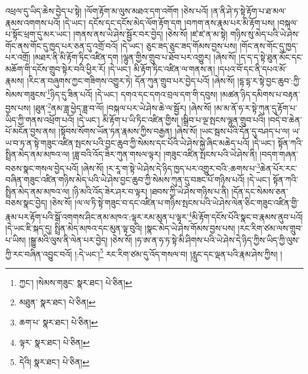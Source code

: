 འཕྲལ་དུ་ཡིད་ཆེས་བྱེད་པ་སྟེ། །ལོག་རྟོག་མ་ལུས་མཐའ་དག་འགོག །ཅེས་པའོ། །ན་ནི་ཤེ་ཏ་སྟེ་རྟོག་པ་ཐ་མལ་རྣམས་འགགས་པའོ། །དེ་ཡང་། དངོས་དང་དངོས་མེད་ལོག་རྟོག་དག །བཀག་ནས་རྣམ་པར་མི་རྟོག་པས། །བསྐལ་པ་སྟོང་ཕྲག་དུ་མར་ཡང་། །གནས་ནས་ཡེ་ཤེས་སྦྱོར་བར་བྱེད། །ཅེས་སོ། །ཛ་ཛ་ན་མ་སྟེ། གཉིས་སུ་མེད་པའི་ཡེ་ཤེས་གོང་ནས་གོང་དུ་ཁྱད་པར་ཅན་དུ་འགྲོ་བའོ། །དེ་ཡང་། ཅུང་ཟད་ཅུང་ཟད་གོམས་བྱས་པས། །གོང་ནས་གོང་དུ་ཁྱད་པར་འགྲོ། །མཐར་ནི་མི་རྟོག་ཏིང་འཛིན་དག །ལྷུན་གྱིས་གྲུབ་པ་ཐོབ་པར་འགྱུར། །ཞེས་སོ། །ད་ད་ད་སྟེ་ཐུན་མོང་དང་མཆོག་གི་དངོས་གྲུབ་སྟེར་བའི་ཕྱིར་རོ། །དེ་ཡང་། མི་རྟོག་ཏིང་འཛིན་ལ་གནས་ན། །དཔའ་བོ་དང་ནི་དཔའ་མོ་རྣམས། །རིང་ན་བཞུགས་ཀྱང་གཟིགས་འགྱུར་ཏེ། དོན་ཀུན་གྲུབ་པར་བྱེད་པའོ། །ཞེས་སོ། །དྷ་དྷ་ར་སྟེ་བྱང་ཆུབ་:ཀྱི་སེམས་གཟུངས་\footnote{ཀྱང་། །སེམས་གཟུང་  སྣར་ཐང་།  པེ་ཅིན། }ཉིད་དུ་ཟིན་པའོ། །དེ་ཡང་། དགའ་དང་དགའ་བྲལ་དག་གི་དབུས། །མཚན་ཉིད་དམིགས་པ་བརྟན་བྱས་པས། །ཐུན་\footnote{མཐུན་  སྣར་ཐང་།  པེ་ཅིན། }ནམ་ཟླ་ཕྱེད་ཟླ་བ་ལོ། །བསྐལ་པར་ཡེ་ཤེས་ཆེ་ལ་སྦྱོར། །ཞེས་སོ། །མ་མ་ནོ་ཧ་ར་སྟེ་ཀུན་དུ་རྟོག་པ་ཡིད་ཀྱི་གནས་འཕྲོག་པའོ། །དེ་ཡང་། མི་རྟོག་པ་ཡི་ཏིང་འཛིན་གྱིས། །སྒྲིབ་པ་ལྔ་སྤངས་ལྷུན་གྲུབ་པའི། །བདེ་བ་ཆེན་པོ་མངོན་བྱས་ནས། །སྟོབས་སོགས་ཡོན་ཏན་རྣམས་ཀྱིས་བརྒྱན། །ཞེས་སོ། །ཡང་སྦས་པའི་དོན་དུ་བཤད་པ་ལ། ཡ་ཡ་བ་ཏ་ན་སྟེ་གཟུང་འཛིན་སྤངས་པའི་བྱང་ཆུབ་ཀྱི་སེམས་དང་པོའི་ཡེ་ཤེས་སྐྱེ་ཞིང་མཆེད་པའོ། །དེ་ཡང་། སྟོན་ཀའི་སྤྲིན་མེད་ནམ་མཁའ་ལ། །ཟླ་བའི་འོད་ཟེར་ཀུན་གསལ་ལྟར། །གཟུང་འཛིན་སྤངས་པའི་ཡེ་ཤེས་ནི། །བདག་གཞན་བཅས་སྣང་གསལ་བྱེད་པའོ། །ཞེས་སོ། །ར་རཱ་ག་སྟེ་ཡེ་ཤེས་དེ་ཉིད་ཁྱད་པར་འགྱུར་བའི་:ཆགས་པ་\footnote{ཆག་པ་  སྣར་ཐང་།  པེ་ཅིན། }ཆེན་པོར་རང་བཞིན་གཟུང་འཛིན་གཉིས་མེད་པའི་ཡེ་ཤེས་བྱང་ཆུབ་ཀྱི་སེམས་ཀུན་དུ་བཟང་པོ་གཉིས་པའོ། །དེ་ཡང་། སྟོན་ཀའི་སྤྲིན་མེད་ནམ་མཁའ་ལ། །ཉི་མའི་འོད་ཟེར་ཤར་བ་ལྟར། །ཐབས་ཀྱི་ཡེ་ཤེས་གཉིས་པ་ནི། །དོན་དང་སེམས་ཅན་བཅས་སྣང་བྱེད། །ཅེས་སོ། །ལ་ལ་ཏི་སྟེ་གཟུང་བ་དང་འཛིན་པ་གཉིས་སྤངས་པའི་ཡེ་ཤེས་ལེན་ཅིང་གཟུང་འཛིན་གྱི་རྣམ་པར་རྟོག་པའི་སྒོ་འགགས་ཤིང་ནམ་མཁའ་:ལྟར་རམ་མུན་པ་ལྟར་\footnote{ལྟར་  སྣར་ཐང་།  པེ་ཅིན། }མི་རྟོག་དངོས་པོའི་སྣང་བ་རྣམས་ནུབ་པའོ། །དེ་ཡང་ཇི་སྐད་དུ། སྤྲིན་མེད་མཁའ་དང་མུན་ལྟ་བུའི། །སྣང་མེད་ཡེ་ཤེས་གོམས་བྱས་པས། །རང་རིག་ཙམ་ལས་གྲུབ་པ་ཡིས། །སྒྱུ་མའི་ལུས་ནི་ལེན་པར་བྱེད། །ཅེས་སོ། །ཧ་ཨ་ན་ཧ་ཏ་སྟེ་མི་ཤིགས་པའི་ཡེ་ཤེས་དེ་ཉིད་ཀྱིས་ཡིད་ཀྱི་ལུས་ཀྱི་རང་བཞིན་འབྱུང་བའོ། །:དེ་ཡང་།\footnote{དེའི།  སྣར་ཐང་།  པེ་ཅིན། } རང་རིག་ཙམ་དུ་འོད་གསལ་བ། །རླུང་དང་ལྡན་པའི་རྣམ་ཤེས་ཀྱིས། །
